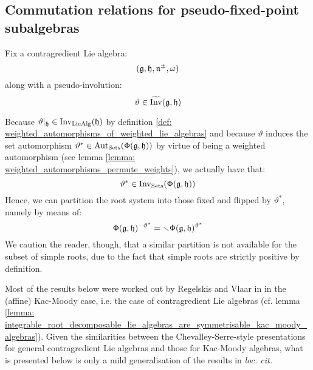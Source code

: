     \subsection{Commutation relations for pseudo-fixed-point subalgebras} \label{subsection: commutation_relations_for_pseudo_fixed_point_subalgebras}
        Fix a contragredient Lie algebra:
            $$(\mathfrak{g}, \mathfrak{h}, \mathfrak{n}^{\pm}, \omega)$$
        along with a pseudo-involution:
            $$\vartheta \in \widetilde{\operatorname{Inv}}(\mathfrak{g}, \mathfrak{h})$$
        \begin{remark}
            Because $\vartheta|_{\mathfrak{h}} \in \operatorname{Inv}_{\mathrm{Lie}\mathrm{Alg}}(\mathfrak{h})$ by definition \ref{def: weighted_automorphisms_of_weighted_lie_algebras} and because $\vartheta$ induces the set automorphism $\vartheta^* \in \operatorname{Aut}_{\mathrm{Sets}}( \mathsf{\Phi}(\mathfrak{g}, \mathfrak{h}) )$ by virtue of being a weighted automorphism (see lemma \ref{lemma: weighted_automorphisms_permute_weights}), we actually have that:
                $$\vartheta^* \in \operatorname{Inv}_{\mathrm{Sets}}( \mathsf{\Phi}(\mathfrak{g}, \mathfrak{h}) )$$
            Hence, we can partition the root system into those fixed and flipped by $\vartheta^*$, namely by means of:
                $$\mathsf{\Phi}(\mathfrak{g}, \mathfrak{h})^{-\vartheta^*} =  \smallsetminus \mathsf{\Phi}(\mathfrak{g}, \mathfrak{h})^{\vartheta^*}$$
            We caution the reader, though, that a similar partition is not available for the subset of simple roots, due to the fact that simple roots are strictly positive by definition.
        \end{remark}
        Most of the results below were worked out by Regelskis and Vlaar in \cite[Section 3]{regelskis_vlaar_kac_moody_pseudo_symmetric_pairs} in the (affine) Kac-Moody case, i.e. the case of  contragredient Lie algebras (cf. lemma \ref{lemma: integrable_root_decomposable_lie_algebras_are_symmetrisable_kac_moody_algebras}). Given the similarities between the Chevalley-Serre-style presentations for general contragredient Lie algebras and those for Kac-Moody algebras, what is presented below is only a mild generalisation of the results in \textit{loc. cit.}

